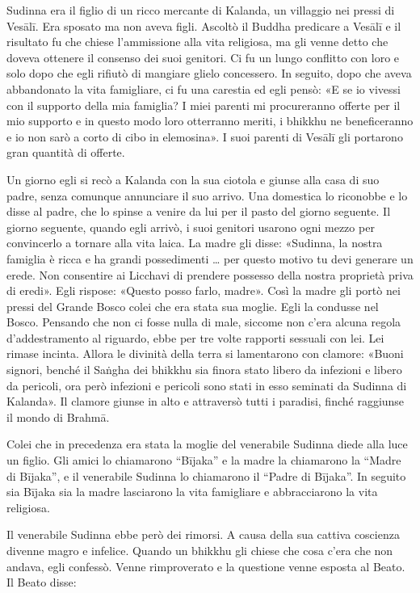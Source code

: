  Sudinna era il figlio di un ricco mercante di
Kalanda, un villaggio nei pressi di Vesālī. Era sposato ma non aveva
figli. Ascoltò il Buddha predicare a Vesālī e il risultato fu che chiese
l’ammissione alla vita religiosa, ma gli venne detto che doveva ottenere
il consenso dei suoi genitori. Ci fu un lungo conflitto con loro e solo
dopo che egli rifiutò di mangiare glielo concessero. In seguito, dopo
che aveva abbandonato la vita famigliare, ci fu una carestia ed egli
pensò: «E se io vivessi con il supporto della mia famiglia? I miei
parenti mi procureranno offerte per il mio supporto e in questo modo
loro otterranno meriti, i bhikkhu ne beneficeranno e io non sarò a
corto di cibo in elemosina». I suoi parenti di Vesālī gli portarono gran
quantità di offerte.


Un giorno egli si recò a Kalanda con la sua ciotola e giunse alla casa
di suo padre, senza comunque annunciare il suo arrivo. Una domestica lo
riconobbe e lo disse al padre, che lo spinse a venire da lui per il
pasto del giorno seguente. Il giorno seguente, quando egli arrivò, i
suoi genitori usarono ogni mezzo per convincerlo a tornare alla vita
laica. La madre gli disse: «Sudinna, la nostra famiglia è ricca e ha
grandi possedimenti … per questo motivo tu devi generare un erede. Non
consentire ai Licchavi di prendere possesso della nostra proprietà priva
di eredi». Egli rispose: «Questo posso farlo, madre». Così la madre gli
portò nei pressi del Grande Bosco colei che era stata sua moglie. Egli
la condusse nel Bosco. Pensando che non ci fosse nulla di male, siccome
non c’era alcuna regola d’addestramento al riguardo, ebbe per tre volte
rapporti sessuali con lei. Lei rimase incinta. Allora le divinità della
terra si lamentarono con clamore: «Buoni signori, benché il Saṅgha dei
bhikkhu sia finora stato libero da infezioni e libero da pericoli, ora
però infezioni e pericoli sono stati in esso seminati da Sudinna di
Kalanda». Il clamore giunse in alto e attraversò tutti i paradisi,
finché raggiunse il mondo di Brahmā.


Colei che in precedenza era stata la moglie del venerabile Sudinna diede
alla luce un figlio. Gli amici lo chiamarono “Bījaka” e la madre la
chiamarono la “Madre di Bījaka”, e il venerabile Sudinna lo chiamarono
il “Padre di Bījaka”. In seguito sia Bījaka sia la madre lasciarono la
vita famigliare e abbracciarono la vita religiosa.


 Il venerabile Sudinna ebbe però dei rimorsi. A causa della
sua cattiva coscienza divenne magro e infelice. Quando un bhikkhu gli
chiese che cosa c’era che non andava, egli confessò. Venne rimproverato
e la questione venne esposta al Beato. Il Beato disse:


